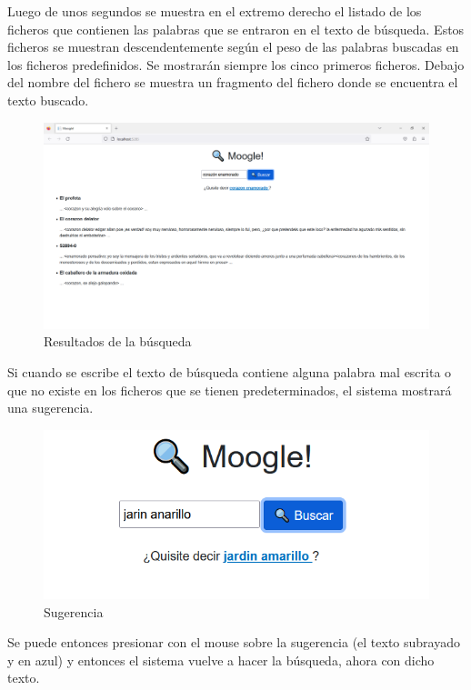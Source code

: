 \documentclass[spanish,10pt,a4paper]{article}
\begin{document}
	Luego de unos segundos se muestra en el extremo derecho el listado de los ficheros que contienen las palabras que se entraron en el texto de búsqueda. Estos ficheros se muestran descendentemente según el peso de las palabras buscadas en los ficheros predefinidos. Se mostrarán siempre los cinco primeros ficheros. 
	Debajo del nombre del fichero se muestra un fragmento del fichero donde se encuentra el texto buscado.
	
	\begin{figure}[H]
		\centering
		\includegraphics[scale=0.35]{img3.png}
		\caption{Resultados de la búsqueda}
		\label{fig: Figura 3}
	\end{figure}
	
	\vspace{1cm}
	
	Si cuando se escribe el texto de búsqueda contiene alguna palabra mal escrita o que no existe en los ficheros que se tienen predeterminados, el sistema mostrará una sugerencia.
	
	\begin{figure}[H]
		\centering
		\includegraphics{img4.png}
		\caption{Sugerencia}
		\label{fig: Figura 4}
	\end{figure}
	
	Se puede entonces presionar con el mouse sobre la sugerencia (el texto subrayado y en azul) y entonces el sistema vuelve a hacer la búsqueda, ahora con dicho texto.
	
\end{document}
